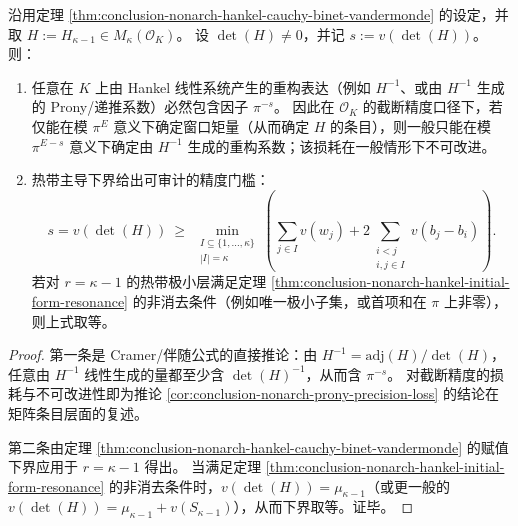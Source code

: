 \begin{theorem}\label{thm:conclusion-nonarch-prony-unavoidable-precision-threshold}
沿用定理 \ref{thm:conclusion-nonarch-hankel-cauchy-binet-vandermonde} 的设定，并取 \(H:=H_{\kappa-1}\in M_\kappa(\mathcal O_K)\)。
设 \(\det(H)\neq 0\)，并记 \(s:=v(\det(H))\)。
则：
\begin{enumerate}
  \item 任意在 \(K\) 上由 Hankel 线性系统产生的重构表达（例如 \(H^{-1}\)、或由 \(H^{-1}\) 生成的 Prony/递推系数）必然包含因子 \(\pi^{-s}\)。
  因此在 \(\mathcal O_K\) 的截断精度口径下，若仅能在模 \(\pi^{E}\) 意义下确定窗口矩量（从而确定 \(H\) 的条目），则一般只能在模 \(\pi^{E-s}\) 意义下确定由 \(H^{-1}\) 生成的重构系数；该损耗在一般情形下不可改进。
  \item 热带主导下界给出可审计的精度门槛：
  \[
  \boxed{\;
  s=v(\det(H))
  \ \ge\
  \min_{\substack{I\subseteq\{1,\dots,\kappa\}\\ |I|=\kappa}}
  \left(
  \sum_{j\in I}v(w_j)
  +2\!\!\sum_{\substack{i<j\\ i,j\in I}}v(b_j-b_i)
  \right).\;}
  \]
  若对 \(r=\kappa-1\) 的热带极小层满足定理 \ref{thm:conclusion-nonarch-hankel-initial-form-resonance} 的非消去条件（例如唯一极小子集，或首项和在 \(\pi\) 上非零），则上式取等。
\end{enumerate}
\end{theorem}
\begin{proof}
第一条是 Cramer/伴随公式的直接推论：由
\(
H^{-1}=\mathrm{adj}(H)/\det(H)
\)，
任意由 \(H^{-1}\) 线性生成的量都至少含 \(\det(H)^{-1}\)，从而含 \(\pi^{-s}\)。
对截断精度的损耗与不可改进性即为推论 \ref{cor:conclusion-nonarch-prony-precision-loss} 的结论在矩阵条目层面的复述。
\par
第二条由定理 \ref{thm:conclusion-nonarch-hankel-cauchy-binet-vandermonde} 的赋值下界应用于 \(r=\kappa-1\) 得出。
当满足定理 \ref{thm:conclusion-nonarch-hankel-initial-form-resonance} 的非消去条件时，\(v(\det(H))=\mu_{\kappa-1}\)（或更一般的 \(v(\det(H))=\mu_{\kappa-1}+v(S_{\kappa-1})\)），从而下界取等。证毕。
\end{proof}
